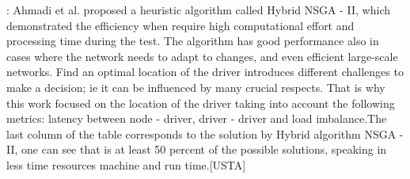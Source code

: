 \documentclass[a4paper,10pt]{article}
\begin{document}


\cite{AhJa15}: Ahmadi et al. proposed a heuristic algorithm called Hybrid NSGA - II, which demonstrated the efficiency when require high computational effort and processing time during the test. The algorithm has good performance also in cases where the network needs to adapt to changes, and even efficient large-scale networks. Find an optimal location of the driver introduces different challenges to make a decision; ie it can be influenced by many crucial respects. That is why this work focused on the location of the driver taking into account the following metrics: latency between node - driver, driver - driver and load imbalance.The last column of the table corresponds to the solution by Hybrid algorithm NSGA - II, one can see that is at least 50 percent of the possible solutions, speaking in less time resources machine and run time.[USTA]
\end{document}
